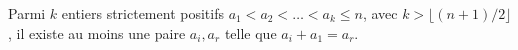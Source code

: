 Parmi $k$ entiers strictement positifs $a_1 < a_2 < \ldots < a_k \leq n$, avec $k > \lfloor (n + 1)/2 \rfloor$, il existe au moins une paire $a_i, a_r$ telle que $a_i + a_1 = a_r$.
